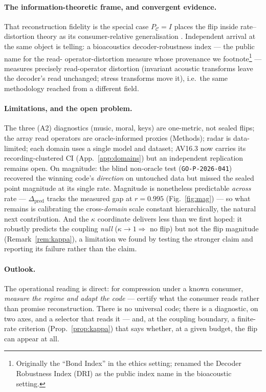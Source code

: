 \documentclass[11pt]{article}
\theoremstyle{remark}
\newcommand{\PC}{P_{\mathcal{C}}}
\newcommand{\kalign}{\kappa}
\newcommand{\seal}[1]{\texttt{GO-P-2026-#1}}
\begin{document}
\paragraph{The information-theoretic frame, and convergent evidence.} That reconstruction
fidelity is the special case $\PC=I$ places the flip inside rate--distortion theory
\citep{shannon1959,cover2006} as its consumer-relative generalisation \citep{cost}.
Independent arrival at the same object
is telling: a bioacoustics decoder-robustness index --- the public name for the read-
operator-distortion measure whose provenance we footnote\footnote{Originally the ``Bond
Index'' in the ethics setting; renamed the Decoder Robustness Index (DRI) as the public
index name in the bioacoustic setting.} --- measures precisely read-operator distortion
(invariant acoustic transforms leave the decoder's read unchanged; stress transforms move
it), i.e.\ the same methodology reached from a different field.

\paragraph{Limitations, and the open problem.} The three (A2) diagnostics (music, moral,
keys) are one-metric, not sealed flips; the array read operators are oracle-informed proxies
(Methods); radar is data-limited; each domain uses a single model and dataset; AV16.3 now
carries its recording-clustered CI (App.~\ref{app:domains}) but an independent replication
remains open. On magnitude: the blind non-oracle test (\seal{041}) recovered the winning code's
\emph{direction} on untouched data but missed the sealed point magnitude at its single rate.
Magnitude is nonetheless predictable \emph{across} rate --- $\Delta_{\mathrm{pred}}$ tracks
the measured gap at $r=0.995$ (Fig.~\ref{fig:mag}) --- so what remains is calibrating the
cross-\emph{domain} scale constant hierarchically, the natural next contribution. And the $\kalign$ coordinate delivers less
than we first hoped: it robustly predicts the coupling \emph{null} ($\kalign\to1\Rightarrow$
no flip) but not the flip magnitude (Remark~\ref{rem:kappa}), a limitation we found by
testing the stronger claim and reporting its failure rather than the claim.

\paragraph{Outlook.} The operational reading is direct: for compression under a known
consumer, \emph{measure the regime and adapt the code} --- certify what the consumer reads
rather than promise reconstruction. There is no universal code; there is a diagnostic, on
two axes, and a selector that reads it --- and, at the coupling boundary, a finite-rate
criterion (Prop.~\ref{prop:kappa}) that says whether, at a given budget, the flip can appear
at all.
\end{document}
